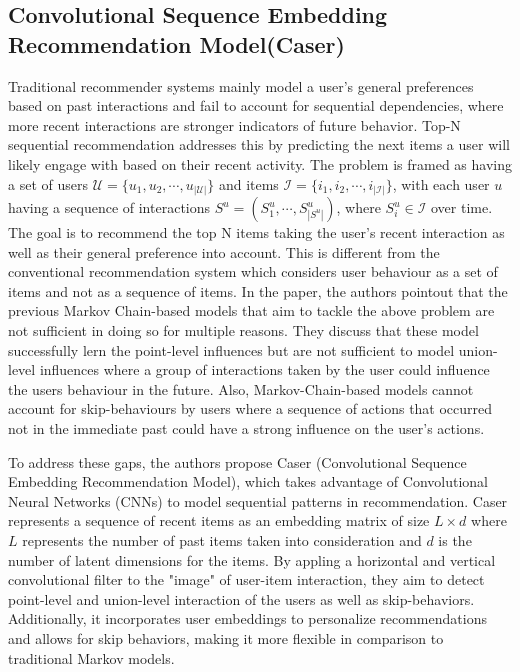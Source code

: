 \documentclass{ieeetj}
\begin{document}
\subsection{Convolutional Sequence Embedding Recommendation Model(Caser)\cite{tang2018personalized}}
Traditional recommender systems mainly model a user's general preferences based on past interactions and fail to account for sequential dependencies, where more recent interactions are stronger indicators of future behavior. Top-N sequential recommendation addresses this by predicting the next items a user will likely engage with based on their recent activity. The problem is framed as having a set of users $\mathcal{U} = \{u_1, u_2, \cdots, u_{|\mathcal{U}|}\}$ and items $\mathcal{I} = \{i_1, i_2, \cdots, i_{|\mathcal{I}|}\}$, with each user $u$ having a sequence of interactions $S^u = (S_1^u, \cdots, S_{|S^u|}^u)$, where $S_i^u \in \mathcal{I}$ over time. The goal is to recommend the top N items taking the user's recent interaction as well as their general preference into account. This is different from the conventional recommendation system which considers user behaviour as a set of items and not as a sequence of items.
In the paper, the authors pointout that the previous Markov Chain-based models that aim to tackle the above problem are not sufficient in doing so for multiple reasons. They discuss that these model successfully lern the point-level influences but are not sufficient to model union-level influences where a group of interactions taken by the user could influence the users behaviour in the future. Also, Markov-Chain-based models cannot account for skip-behaviours by users where a sequence of actions that occurred not in the immediate past could have a strong influence on the user's actions. 

To address these gaps, the authors propose Caser (Convolutional Sequence Embedding Recommendation Model), which takes advantage of Convolutional Neural Networks (CNNs) to model sequential patterns in recommendation. Caser represents a sequence of recent items as an embedding matrix of size $L\times d$ where $L$ represents the number of past items taken into consideration and $d$ is the number of latent dimensions for the items. By appling a horizontal and vertical convolutional filter to the "image" of user-item interaction, they aim to detect point-level and union-level interaction of the users as well as skip-behaviors. Additionally, it incorporates user embeddings to personalize recommendations and allows for skip behaviors, making it more flexible in comparison to traditional Markov models.
\end{document}
